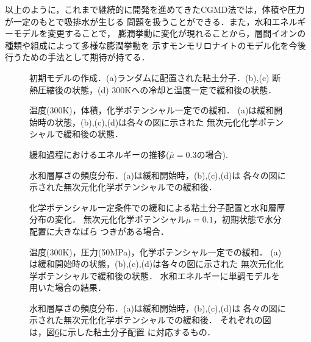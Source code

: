 以上のように，これまで継続的に開発を進めてきたCGMD法では，体積や圧力が一定のもとで吸排水が生じる
問題を扱うことができる．また，水和エネルギーモデルを変更することで，
膨潤挙動に変化が現れることから，層間イオンの種類や組成によって多様な膨潤挙動を
示すモンモリロナイトのモデル化を今後行うための手法として期待が持てる．
\begin{figure}[h]
	\begin{center}
	\end{center}
	\caption{
		初期モデルの作成．(a)ランダムに配置された粘土分子．(b),(c) 断熱圧縮後の状態，(d)
		300Kへの冷却と温度一定で緩和後の状態．
	} 
	\label{fig:fig3}
\end{figure}
\begin{figure}[h]
	\begin{center}
	\end{center}
	\caption{
		温度(300K)，体積，化学ポテンシャル一定での緩和．
		(a)は緩和開始時の状態，(b),(c),(d)は各々の図に示された
		無次元化化学ポテンシャルで緩和後の状態．
	} 
	\label{fig:fig4}
\end{figure}
\begin{figure}[h]
	\begin{center}
	\end{center}
	\caption{
		緩和過程におけるエネルギーの推移($\bar{\mu}=0.3の場合$).
	} 
	\label{fig:fig5}
\end{figure}
\begin{figure}[h]
	\begin{center}
	\end{center}
	\caption{
		水和層厚さの頻度分布．(a)は緩和開始時，(b),(c),(d)は
		各々の図に示された無次元化化学ポテンシャルでの緩和後．
	} 
	\label{fig:fig6}
\end{figure}
\begin{figure}[h]
	\begin{center}
	\end{center}
	\caption{
		化学ポテンシャル一定条件での緩和による粘土分子配置と水和層厚分布の変化．
		無次元化化学ポテンシャル$\bar{\mu}=0.1$，初期状態で水分配置に大きなばら
		つきがある場合．
	} 
	\label{fig:fig7}
\end{figure}
\begin{figure}[h]
	\begin{center}
	\end{center}
	\caption{
		温度(300K)，圧力(50MPa)，化学ポテンシャル一定での緩和．
		(a)は緩和開始時の状態，(b),(c),(d)は各々の図に示された
		無次元化化学ポテンシャルで緩和後の状態．
		水和エネルギーに単調モデルを用いた場合の結果．
	} 
	\label{fig:fig8}
\end{figure}
\begin{figure}[h]
	\begin{center}
	\end{center}
	\caption{
		水和層厚さの頻度分布．(a)は緩和開始時，(b),(c),(d)は
		各々の図に示された無次元化化学ポテンシャルでの緩和後．
		それぞれの図は，図\ref{fig:fig8}に示した粘土分子配置
		に対応するもの．
	} 
	\label{fig:fig9}
\end{figure}

